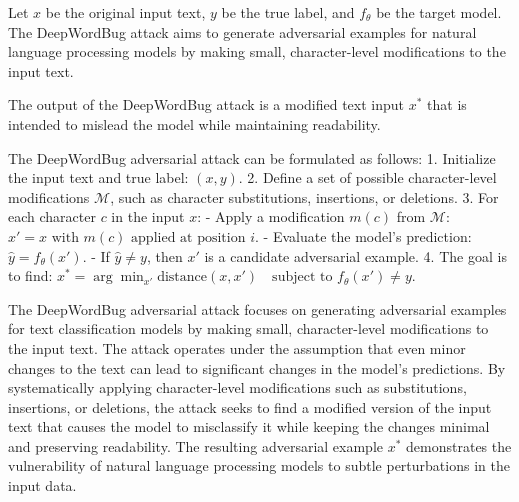 
Let \( x \) be the original input text, \( y \) be the true label, and \( f_{\theta} \) be the target model. The DeepWordBug attack aims to generate adversarial examples for natural language processing models by making small, character-level modifications to the input text.

The output of the DeepWordBug attack is a modified text input \( x^* \) that is intended to mislead the model while maintaining readability.

The DeepWordBug adversarial attack can be formulated as follows:
1. Initialize the input text and true label:
   $
   (x, y).
   $
2. Define a set of possible character-level modifications \( \mathcal{M} \), such as character substitutions, insertions, or deletions.
3. For each character \( c \) in the input \( x \):
   - Apply a modification \( m(c) \) from \( \mathcal{M} \):
   $
   x' = x \text{ with } m(c) \text{ applied at position } i.
   $
   - Evaluate the model's prediction:
   $
   \hat{y} = f_{\theta}(x').
   $
   - If \( \hat{y} \neq y \), then \( x' \) is a candidate adversarial example.
4. The goal is to find:
   $
   x^* = \arg\min_{x'} \text{distance}(x, x') \quad \text{subject to } f_{\theta}(x') \neq y.
   $

The DeepWordBug adversarial attack focuses on generating adversarial examples for text classification models by making small, character-level modifications to the input text. The attack operates under the assumption that even minor changes to the text can lead to significant changes in the model's predictions. By systematically applying character-level modifications such as substitutions, insertions, or deletions, the attack seeks to find a modified version of the input text that causes the model to misclassify it while keeping the changes minimal and preserving readability. The resulting adversarial example \( x^* \) demonstrates the vulnerability of natural language processing models to subtle perturbations in the input data.